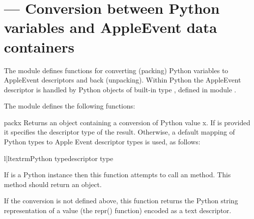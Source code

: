 \section{ ---
         Conversion between Python variables and AppleEvent data containers}



The  module defines functions for converting (packing)
Python variables to AppleEvent descriptors and back (unpacking).
Within Python the AppleEvent descriptor is handled by Python objects
of built-in type , defined in module .

The  module defines the following functions:


\begin{funcdesc}{pack}{x}
Returns an  object  containing a conversion of Python
value x. If  is provided it specifies the descriptor
type of the result. Otherwise, a default mapping of Python types to
Apple Event descriptor types is used, as follows:

\begin{tableii}{l|l}{textrm}{Python type}{descriptor type}
\end{tableii}  
 
If  is a Python instance then this function attempts to call an
 method.  This method should return an
 object.

If the conversion  is not defined above, this function returns
the Python string representation of a value (the repr() function)
encoded as a text descriptor.
\end{funcdesc}


